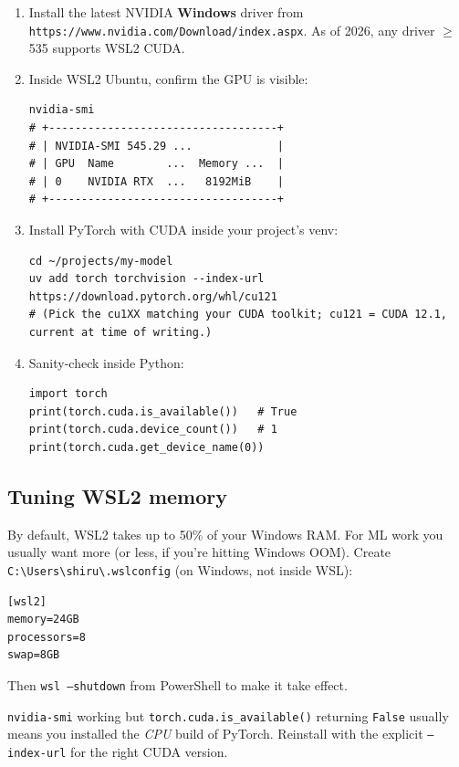 \documentclass[11pt,a4paper]{article}
\begin{document}
\begin{enumerate}[leftmargin=*]
\item Install the latest NVIDIA \textbf{Windows} driver from
\texttt{https://www.nvidia.com/Download/index.aspx}. As of 2026,
any driver $\geq$ 535 supports WSL2 CUDA.
\item Inside WSL2 Ubuntu, confirm the GPU is visible:
\begin{lstlisting}[style=bashstyle]
nvidia-smi
# +-----------------------------------+
# | NVIDIA-SMI 545.29 ...             |
# | GPU  Name        ...  Memory ...  |
# | 0    NVIDIA RTX  ...   8192MiB    |
# +-----------------------------------+
\end{lstlisting}
\item Install PyTorch with CUDA inside your project's venv:
\begin{lstlisting}[style=bashstyle]
cd ~/projects/my-model
uv add torch torchvision --index-url https://download.pytorch.org/whl/cu121
# (Pick the cu1XX matching your CUDA toolkit; cu121 = CUDA 12.1, current at time of writing.)
\end{lstlisting}
\item Sanity-check inside Python:
\begin{lstlisting}[style=pystyle]
import torch
print(torch.cuda.is_available())   # True
print(torch.cuda.device_count())   # 1
print(torch.cuda.get_device_name(0))
\end{lstlisting}
\end{enumerate}

\subsection*{Tuning WSL2 memory}

By default, WSL2 takes up to 50\% of your Windows RAM. For ML work
you usually want more (or less, if you're hitting Windows OOM).
Create \texttt{C:\textbackslash{}Users\textbackslash{}shiru\textbackslash{}.wslconfig}
(on Windows, not inside WSL):

\begin{lstlisting}[style=bashstyle]
[wsl2]
memory=24GB
processors=8
swap=8GB
\end{lstlisting}

Then \texttt{wsl --shutdown} from PowerShell to make it take effect.

\begin{gotcha}
\texttt{nvidia-smi} working but \texttt{torch.cuda.is\_available()}
returning \texttt{False} usually means you installed the
\emph{CPU} build of PyTorch. Reinstall with the explicit
\texttt{--index-url} for the right CUDA version.
\end{gotcha}
\end{document}
